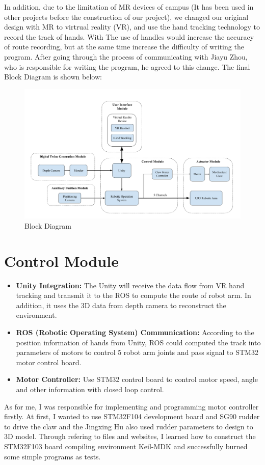 \documentclass{senior-design-individual}
\begin{document}
In addition, due to the limitation of MR devices of campus (It has been used in other projects before the construction of our project), we changed our original design with MR to virtrual reality (VR), and use the hand tracking technology to record the track of hands. With The use of handles would increase the accuracy of route recording, but at the same time increase the difficulty of writing the program. After going through the process of communicating with Jiayu Zhou, who is responsible for writing the program, he agreed to this change. The final Block Diagram is shown below:
\begin{figure}[h]
    \centering
    \includegraphics[width=0.8\linewidth]{Block Diagram.png}
    \caption{Block Diagram}
\end{figure}
 
\section{Control Module}
    \begin{itemize}
        \item \textbf{Unity Integration:} The Unity will receive the data flow from VR hand tracking and transmit it to the ROS to compute the route of robot arm. In addition, it uses the 3D data from depth camera to reconstruct the environment.
        \item \textbf{ROS (Robotic Operating System) Communication:} According to the position information of hands from Unity, ROS could computed the track into parameters of motors to control 5 robot arm joints and pass signal to STM32 motor control board.
        \item \textbf{Motor Controller:} Use STM32 control board to control motor speed, angle and other information with closed loop control.
    \end{itemize}
 
As for me, I was responsible for implementing and programming motor controller firstly. At first, I wanted to use STM32F104 development board and SG90 rudder to drive the claw and the Jingxing Hu also used rudder parameters to design to 3D model. Through refering to files and websites, I learned how to construct the STM32F103 board compiling environment Keil-MDK \cite{csdn_daniaoxp_2025} and successfully burned some simple programs as tests.
 
\end{document}
